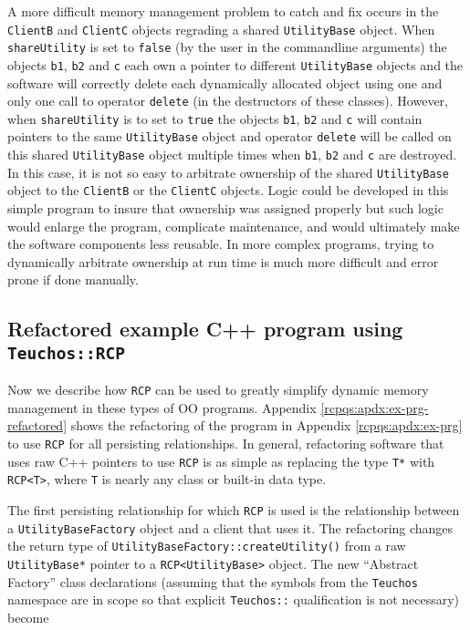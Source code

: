 \documentclass[pdf,ps2pdf,11pt]{SANDreport}
\begin{document}
A more difficult memory management problem to catch and fix occurs in
the {}\texttt{ClientB} and {}\texttt{ClientC} objects regrading a
shared {}\texttt{Utility\-Base} object.  When {}\texttt{shareUtility}
is set to {}\texttt{false} (by the user in the commandline arguments)
the objects {}\texttt{b1}, {}\texttt{b2} and {}\texttt{c} each own a
pointer to different {}\texttt{Utility\-Base} objects and the software
will correctly delete each dynamically allocated object using one and
only one call to operator {}\texttt{delete} (in the destructors of
these classes).  However, when {}\texttt{shareUtility} is to set to
{}\texttt{true} the objects {}\texttt{b1}, {}\texttt{b2} and
{}\texttt{c} will contain pointers to the same
{}\texttt{Utility\-Base} object and operator {}\texttt{delete} will be
called on this shared {}\texttt{Utility\-Base} object multiple times
when {}\texttt{b1}, {}\texttt{b2} and {}\texttt{c} are destroyed.  In
this case, it is not so easy to arbitrate ownership of the shared
{}\texttt{Utility\-Base} object to the {}\texttt{ClientB} or the
{}\texttt{ClientC} objects.  Logic could be developed in this simple
program to insure that ownership was assigned properly but such logic
would enlarge the program, complicate maintenance, and would
ultimately make the software components less reusable.  In more
complex programs, trying to dynamically arbitrate ownership at run
time is much more difficult and error prone if done manually.

%
\subsection{Refactored example C++ program using {}\texttt{Teuchos::RCP}}
\label{rcpbg:sec:refactored-program}
%

Now we describe how {}\texttt{RCP} can be used to
greatly simplify dynamic memory management in these types of OO
programs.  Appendix {}\ref{rcpqs:apdx:ex-prg-refactored} shows the
refactoring of the program in Appendix {}\ref{rcpqs:apdx:ex-prg} to
use {}\texttt{RCP} for all persisting relationships.
In general, refactoring software that uses raw C++ pointers to use
{}\texttt{RCP} is as simple as replacing the type
{}\texttt{T*} with {}\texttt{RCP<T>}, where {}\texttt{T}
is nearly any class or built-in data type.

The first persisting relationship for which
{}\texttt{RCP} is used is the relationship between a
{}\texttt{Utility\-Base\-Factory} object and a client that uses it.
The refactoring changes the return type of
{}\texttt{Utility\-Base\-Factory\-::createUtility()} from a raw
{}\texttt{Utility\-Base*} pointer to a
{}\texttt{RCP<Utility\-Base>} object.  The new ``Abstract
Factory'' class declarations (assuming that the symbols from the
{}\texttt{Teuchos} namespace are in scope so that explicit
{}\texttt{Teuchos::} qualification is not necessary) become
\end{document}
